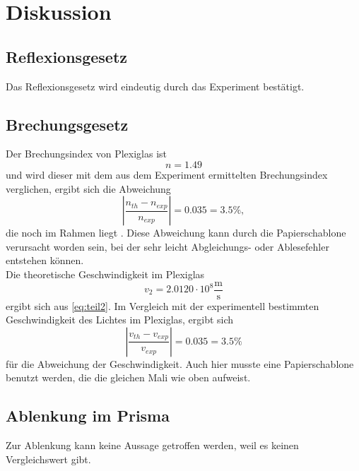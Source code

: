 \section{Diskussion}
\label{sec:Diskussion}

\subsection{Reflexionsgesetz}
Das Reflexionsgesetz wird eindeutig durch das Experiment bestätigt.

\subsection{Brechungsgesetz}
Der Brechungsindex von Plexiglas ist 
\begin{equation*}
  n=1.49
\end{equation*}
und wird dieser mit dem aus dem Experiment ermittelten Brechungsindex verglichen, ergibt sich die Abweichung
\begin{equation*}
  |\frac{n_{th} - n_{exp}}{n_{exp}}|=0.035=3.5\%,
\end{equation*}
die noch im Rahmen liegt \cite{2}. Diese Abweichung kann durch die Papierschablone verursacht worden sein, bei der sehr leicht Abgleichungs- oder Ablesefehler entstehen können.\\
Die theoretische Geschwindigkeit im Plexiglas
\begin{equation*}
  v_2=2.0120\cdot 10^8 \frac{\textrm{m}}{\textrm{s}}
\end{equation*} 
ergibt sich aus \autoref{eq:teil2}. Im Vergleich mit der experimentell bestimmten Geschwindigkeit des Lichtes im Plexiglas, ergibt sich 
\begin{equation*}
  |\frac{v_{th} - v_{exp}}{v_{exp}}|=0.035=3.5\%
\end{equation*}
für die Abweichung der Geschwindigkeit. Auch hier musste eine Papierschablone benutzt werden, die die gleichen Mali wie oben aufweist.

\subsection{Ablenkung im Prisma}
Zur Ablenkung kann keine Aussage getroffen werden, weil es keinen Vergleichswert gibt. 

